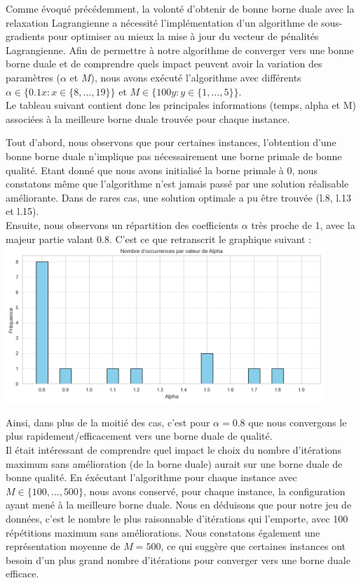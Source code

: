 \documentclass[french,nochapter,11pt]{rapportUB}
\begin{document}
	Comme évoqué précédemment, la volonté d'obtenir de bonne borne duale avec la relaxation Lagrangienne a nécessité l'implémentation d'un algorithme de sous-gradients pour optimiser au mieux la mise à jour du vecteur de pénalités Lagrangienne. Afin de permettre à notre algorithme de converger vers une bonne borne duale et de comprendre quels impact peuvent avoir la variation des paramètres ($\alpha$ et $M$), nous avons exécuté l'algorithme avec différents $\alpha \in \{ 0.1 x : x \in \{8,\dots,19\}\}$ et $M \in \{100 y : y \in \{1,\dots,5\}\}$. \\
	Le tableau suivant contient donc les principales informations (temps, alpha et M) associées à la meilleure borne duale trouvée pour chaque instance. 
	
	
	
	
	
	Tout d'abord, nous observons  que pour certaines instances, l'obtention d'une bonne borne duale n'implique pas nécessairement une borne primale de bonne qualité. Etant donné que nous avons initialisé la borne primale à 0, nous constatons même que l'algorithme n'est jamais passé par une solution réalisable améliorante. Dans de rares cas, une solution optimale a pu être trouvée (l.8, l.13 et l.15).  \\
	Ensuite, nous observons un répartition des coefficients $\alpha$ très proche de 1, avec la majeur partie valant $0.8$. C'est ce que retranscrit le graphique suivant  : \\
	
	\includegraphics[width=0.9\textwidth]{bestAlpha.png}
	
Ainsi, dans plus de la moitié des cas, c'est pour $\alpha = 0.8$ que nous convergons le plus rapidement/efficacement vers une borne duale de qualité.  \\




Il était intéressant de comprendre quel impact le choix du nombre d'itérations maximum sans amélioration (de la borne duale) aurait sur une borne duale de bonne qualité. En éxécutant l'algorithme pour chaque instance avec $M  \in \{100,\dots,500\}$, nous avons conservé, pour chaque instance, la configuration ayant mené à la meilleure borne duale. Nous en déduisons que pour notre jeu de données, c'est le nombre le plus raisonnable d'itérations qui l'emporte, avec 100 répétitions maximum sans améliorations. Nous constatons également une représentation moyenne de $M = 500$, ce qui suggère que certaines instances ont besoin d'un plus grand nombre d'itérations pour converger vers une borne duale efficace. 
\end{document}
